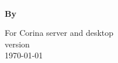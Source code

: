 \begin{titlepage}
\AddToShipoutPicture*{\BackgroundPic}




\includegraphics{Images/pixel.png}\\[187mm] 
{
\raggedleft
\Large \textbf{By \authornames}\\
}

\vfill
{
\large For Corina server and desktop\\
version \versionnumber\\[2mm]
\today\\[2mm]
}



\end{titlepage}